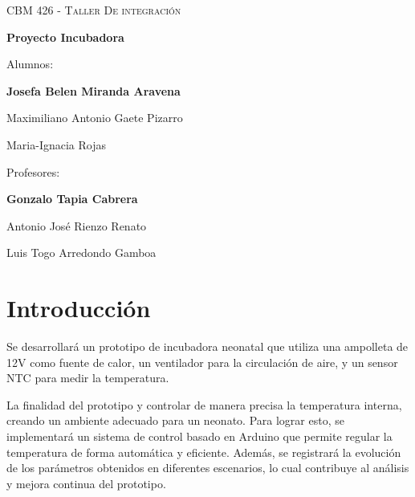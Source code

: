 \documentclass[spanish, a4paper, 11pt]{article}
\begin{document}
\thispagestyle{unicamp}

\begin{center}

	\null\vfill

	{\scshape\large CBM 426 - Taller De integración\par}

	\baselineskip

	{\LARGE\bfseries Proyecto Incubadora\par}

	\baselineskip

	Alumnos:\\[1ex]
	{\large\bfseries Josefa Belen Miranda Aravena

	Maximiliano Antonio Gaete Pizarro

	Maria-Ignacia Rojas \par}

	\baselineskip

	Profesores:\\[1ex]
	{\large\bfseries Gonzalo Tapia Cabrera

	Antonio José Rienzo Renato

	Luis Togo Arredondo Gamboa\par}

\end{center}

\vfill




\newpage

\onehalfspacing

\tableofcontents

\newpage

\section{Introducción}

Se desarrollará un prototipo de incubadora neonatal que utiliza una ampolleta de 12V como fuente de calor, un ventilador para la circulación de aire, y un sensor NTC para medir la temperatura. 

La finalidad del prototipo y controlar de manera precisa la temperatura interna, creando un ambiente adecuado para un neonato. Para lograr esto, se implementará un sistema de control basado en Arduino que permite regular la temperatura de forma automática y eficiente. Además, se registrará la evolución de los parámetros obtenidos en diferentes escenarios, lo cual contribuye al análisis y mejora continua del prototipo.\par
\end{document}
